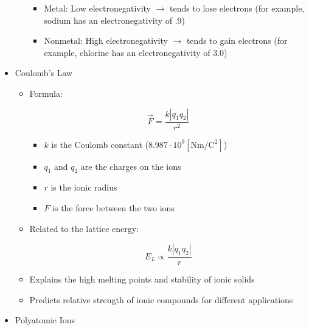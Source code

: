\begin{itemize}
\begin{itemize}
\begin{itemize}
          \item Metal: Low electronegativity $\to$ tends to lose electrons (for example, sodium has an electronegativity of .9)

          \item Nonmetal: High electronegativity $\to$ tends to gain electrons (for example, chlorine has an electronegativity of 3.0)

        \end{itemize}

    \end{itemize}

  \item Coulomb's Law

    \begin{itemize}

      \item Formula:

        $$\vec{F}=\frac{k|q_1q_2|}{r^2}$$

        \begin{itemize}

          \item $k$ is the Coulomb constant ($8.987\cdot10^9[\si{\newton\meter\per\coulomb\squared}]$)

          \item $q_1$ and $q_2$ are the charges on the ions

          \item $r$ is the ionic radius

          \item $F$ is the force between the two ions

        \end{itemize}

      \item Related to the lattice energy:

        $$E_L\propto \frac{k|q_1q_2|}{r}$$

      \item Explains the high melting points and stability of ionic solids

      \item Predicts relative strength of ionic compounds for different applications

    \end{itemize}

  \item Polyatomic Ions

    \begin{itemize}


\end{itemize}
\end{itemize}
